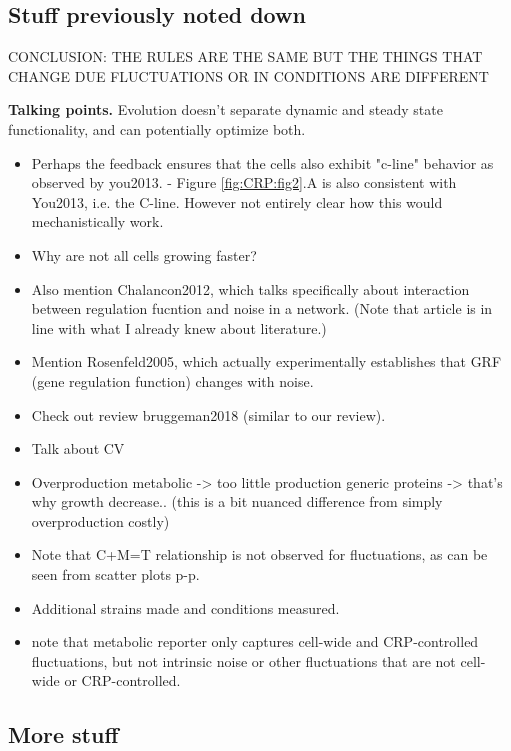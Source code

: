 \subsection*{Stuff previously noted down}

CONCLUSION: THE RULES ARE THE SAME BUT THE THINGS THAT CHANGE DUE FLUCTUATIONS OR IN CONDITIONS ARE DIFFERENT

\textbf{Talking points.} Evolution doesn't separate dynamic and steady state functionality, and can potentially optimize both.

\begin{itemize}
%
\item Perhaps the feedback ensures that the cells also exhibit "c-line" behavior as observed by you2013.
- Figure \ref{fig:CRP:fig2}.A is also consistent with You2013, i.e. the C-line. However not entirely clear how this would mechanistically work.
\item Why are not all cells growing faster?
\item Also mention Chalancon2012, which talks specifically about interaction between regulation fucntion and noise in a network. (Note that article is in line with what I already knew about literature.)
\item Mention Rosenfeld2005, which actually experimentally establishes that GRF (gene regulation function) changes with noise.
\item Check out review bruggeman2018 (similar to our review).
\item Talk about CV
\item Overproduction metabolic -> too little production generic proteins -> that's why growth decrease.. (this is a bit nuanced difference from simply overproduction costly)
%
\item Note that C+M=T relationship is not observed for fluctuations, as can be seen from scatter plots p-p.
%
\item Additional strains made and conditions measured.
%
\item note that metabolic reporter only captures cell-wide and CRP-controlled fluctuations, but not intrinsic noise or other fluctuations that are not cell-wide or CRP-controlled.
\end{itemize}

\subsection*{More stuff}




